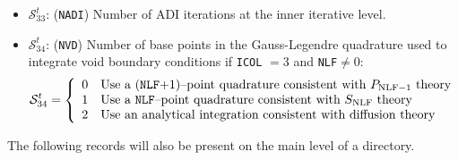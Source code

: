 \begin{itemize}
\item $\mathcal{S}^{t}_{33}$: ({\tt NADI}) Number of ADI iterations at the inner
iterative level.

\item $\mathcal{S}^{t}_{34}$: ({\tt NVD}) Number of base points in the Gauss-Legendre quadrature used to integrate
void boundary conditions if {\tt ICOL} $=3$ and {\tt NLF}$\ne 0$:
\begin{displaymath}
\mathcal{S}^{t}_{34} = \left\{
\begin{array}{rl}
 0 & \textrm{Use a ({\tt NLF}$+1$)--point quadrature consistent with $P_{{\rm NLF}-1}$ theory} \\
 1 & \textrm{Use a {\tt NLF}--point quadrature consistent with $S_{\rm NLF}$ theory} \\
 2 & \textrm{Use an analytical integration consistent with diffusion theory}
\end{array} \right.
\end{displaymath}

\end{itemize}

The following records will also be present on the main level of a 
directory.

